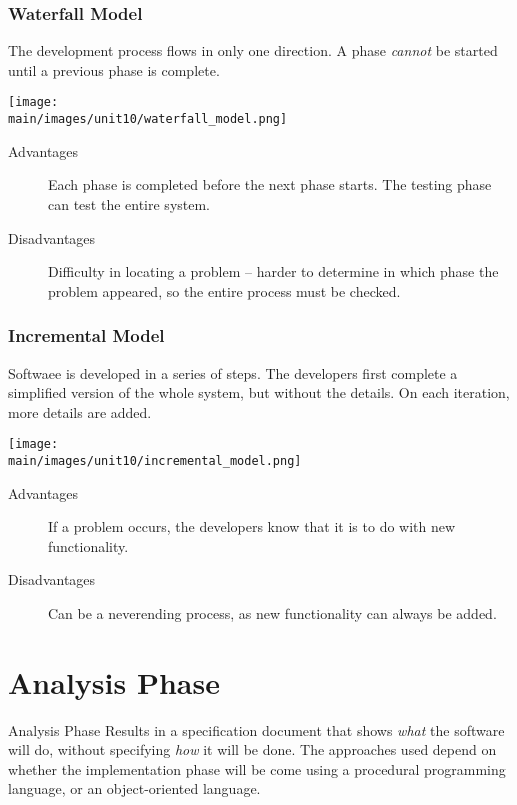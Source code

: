 \documentclass[\main/notes.tex]{subfiles}
\begin{document}
				\subsubsection{Waterfall Model}
					The development process flows in only one direction. A phase \emph{cannot} be started until a previous phase is complete.
					\begin{center}
						\texttt{[image: \\main/images/unit10/waterfall\_model.png]}
					\end{center}
					\begin{indentparagraph}
						\begin{description}
							\item[Advantages] Each phase is completed before the next phase starts. The testing phase can test the entire system.
							\item[Disadvantages] Difficulty in locating a problem -- harder to determine in which phase the problem appeared, so the entire process must be checked.
						\end{description}
					\end{indentparagraph}
				\subsubsection{Incremental Model}
					Softwaee is developed in a series of steps. The developers first complete a simplified version of the whole system, but without the details. On each iteration, more details are added.
					\begin{center}
						\texttt{[image: \\main/images/unit10/incremental\_model.png]}
					\end{center}
					\begin{indentparagraph}
						\begin{description}
							\item[Advantages] If a problem occurs, the developers know that it is to do with new functionality.
							\item[Disadvantages] Can be a neverending process, as new functionality can always be added.
						\end{description}
					\end{indentparagraph}

		\section{Analysis Phase}
			\begin{definition}{Analysis Phase}
				Results in a specification document that shows \emph{what} the software will do, without specifying \emph{how} it will be done. The approaches used depend on whether the implementation phase will be come using a procedural programming language, or an object-oriented language.
			\end{definition}
\end{document}
